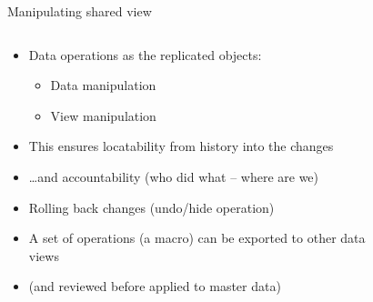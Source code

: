 \documentclass[aspectratio=169]{beamer}
\begin{document}
\begin{frame}{Manipulating shared view}
    \begin{columns}
        \begin{column}{0.6\textwidth}
            \begin{itemize}
                \small
                \item Data operations as the replicated objects:
                \begin{itemize}
                    \footnotesize
                    \item Data manipulation
                    \item View manipulation 
                \end{itemize}
                \item This ensures locatability from history into the changes
                \item \dots and accountability (who did what -- where are we)
                \item Rolling back changes (undo/hide operation)
                \item A set of operations (a macro) can be exported to other data views
                \item (and reviewed before applied to master data)
            \end{itemize}
        \end{column}
        \begin{column}{0.45\textwidth}
            \begin{figure}[h]
                \vspace{-4em}
                \centering

\end{figure}
\end{column}
\end{columns}
\end{frame}
\end{document}
